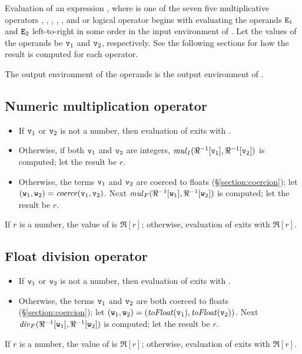 \EVALUATION

Evaluation of an expression , where
 is one of the \ifStd seven \else five \fi multiplicative
operators \TXT{*}, \TXT{/},
\ifStd\TXT{//}, \fi{}, \ifStd{}, \fi{} and
 or logical operator  begins with evaluating
the operands ${\tt{\sl E}}_1$ and ${\tt{\sl E}}_2$
\ifStd left-to-right \fi \ifOld in some order \fi
in the input environment of .  Let the values
of the operands be ${\tt{\sl v}}_1$ and ${\tt{\sl v}}_2$, respectively.
See the following sections for how the result is computed for each
operator.

\ENVIRONMENTS

The output environment of the operands is the output environment of
.

\subsection{Numeric multiplication operator \T{*}}

\label{section:multiplication}

\begin{itemize}
\item If ${\tt{\sl v}}_1$ or ${\tt{\sl v}}_2$ is not a number, then
evaluation of  exits with \T{\badarith}.
\item Otherwise, if both ${\tt{\sl v}}_1$ and ${\tt{\sl v}}_2$ are integers,
$\mathit{mul}_I(\Re^{-1}[{\tt{\sl v}}_1],\Re^{-1}[{\tt{\sl v}}_2])$ is
computed; let the result be $r$.
\item Otherwise, the terms ${\tt{\sl v}}_1$ and ${\tt{\sl v}}_2$ are coerced to floats
(\S\ref{section:coercion});
let $({\tt{\sl w}}_1,{\tt{\sl w}}_2)=\mathit{coerce}({\tt{\sl v}}_1,{\tt{\sl v}}_2)$.
Next $\mathit{mul}_F(\Re^{-1}[{\tt{\sl w}}_1],\Re^{-1}[{\tt{\sl w}}_2])$ is
computed; let the result be $r$.
\end{itemize}
If $r$ is a number, the value of  is $\Re[r]$;
otherwise, evaluation of  exits with $\Re[r]$.

\subsection{Float division operator \T{/}}

\label{section:floatdiv}

\begin{itemize}
\item If ${\tt{\sl v}}_1$ or ${\tt{\sl v}}_2$ is not a number, then
evaluation of  exits with \T{\badarith}.
\item Otherwise, the terms ${\tt{\sl v}}_1$ and ${\tt{\sl v}}_2$ are both coerced to floats
(\S\ref{section:coercion}); let $({\tt{\sl w}}_1,{\tt{\sl w}}_2)=
(\mathit{toFloat}({\tt{\sl v}}_1),\mathit{toFloat}({\tt{\sl v}}_2))$.
Next $\mathit{div}_F(\Re^{-1}[{\tt{\sl w}}_1],\Re^{-1}[{\tt{\sl w}}_2])$ is computed; let the result be $r$.
\end{itemize}
If $r$ is a number, the value of  is $\Re[r]$;
otherwise, evaluation of  exits with $\Re[r]$.

